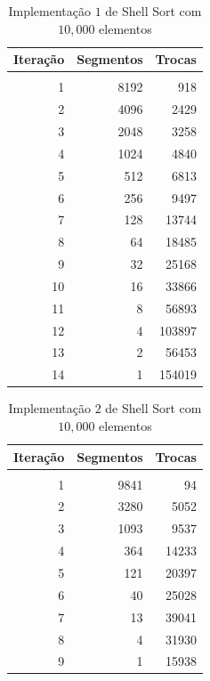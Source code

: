 \documentclass[titlepage,12pt,a4paper]{article}
\begin{document}
    \begin{table}[h]
      \caption{Implementação $1$ de Shell Sort com $10,000$ elementos \label{tab:10000seq1}}
      \begin{center}
        \begin{tabular}{ r | r | r }
          Iteração & Segmentos & Trocas \\
          \hline \\
          1 & 8192 & 918 \\
          2 & 4096 & 2429 \\
          3 & 2048 & 3258 \\
          4 & 1024 & 4840 \\
          5 & 512 & 6813 \\
          6 & 256 & 9497 \\
          7 & 128 & 13744 \\
          8 & 64 & 18485 \\
          9 & 32 & 25168 \\
          10 & 16 & 33866 \\
          11 & 8 & 56893 \\
          12 & 4 & 103897 \\
          13 & 2 & 56453 \\
          14 & 1 & 154019
        \end{tabular}
      \end{center}
    \end{table}

    \begin{table}[h]
      \caption{Implementação $2$ de Shell Sort com $10,000$ elementos \label{tab:10000seq2}}
      \begin{center}
        \begin{tabular}{ r | r | r }
          Iteração & Segmentos & Trocas \\
          \hline \\
          1 & 9841 & 94 \\
          2 & 3280 & 5052 \\
          3 & 1093 & 9537 \\
          4 & 364 & 14233 \\
          5 & 121 & 20397 \\
          6 & 40 & 25028 \\
          7 & 13 & 39041 \\
          8 & 4 & 31930 \\
          9 & 1 & 15938
        \end{tabular}
      \end{center}
    \end{table}
\end{document}
